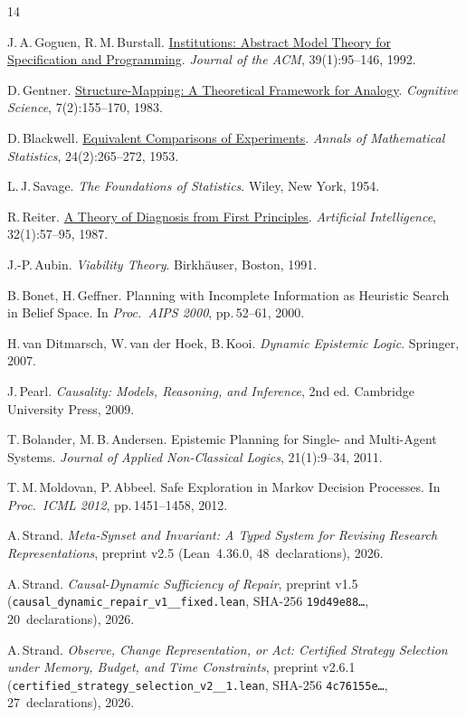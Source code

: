 \documentclass[10pt,a4paper]{article}
\theoremstyle{cleanthm}
\theoremstyle{cleandef}
\begin{document}
\begin{thebibliography}{14}
\small\setlength{\itemsep}{2pt}

J.\,A.\,Goguen, R.\,M.\,Burstall. \href{https://doi.org/10.1145/147508.147524}{Institutions: Abstract Model Theory for Specification and Programming}. \emph{Journal of the ACM}, 39(1):95--146, 1992.

D.\,Gentner. \href{https://doi.org/10.1207/s15516709cog0702_3}{Structure-Mapping: A Theoretical Framework for Analogy}. \emph{Cognitive Science}, 7(2):155--170, 1983.

D.\,Blackwell. \href{https://doi.org/10.1214/aoms/1177729032}{Equivalent Comparisons of Experiments}. \emph{Annals of Mathematical Statistics}, 24(2):265--272, 1953.

L.\,J.\,Savage. \emph{The Foundations of Statistics}. Wiley, New York, 1954.

R.\,Reiter. \href{https://doi.org/10.1016/0004-3702(87)90062-2}{A Theory of Diagnosis from First Principles}. \emph{Artificial Intelligence}, 32(1):57--95, 1987.

J.-P.\,Aubin. \emph{Viability Theory}. Birkh\"auser, Boston, 1991.

B.\,Bonet, H.\,Geffner. Planning with Incomplete Information as Heuristic Search in Belief Space. In \emph{Proc.\ AIPS 2000}, pp.\,52--61, 2000.

H.\,van Ditmarsch, W.\,van der Hoek, B.\,Kooi. \emph{Dynamic Epistemic Logic}. Springer, 2007.

J.\,Pearl. \emph{Causality: Models, Reasoning, and Inference}, 2nd ed. Cambridge University Press, 2009.

T.\,Bolander, M.\,B.\,Andersen. Epistemic Planning for Single- and Multi-Agent Systems. \emph{Journal of Applied Non-Classical Logics}, 21(1):9--34, 2011.

T.\,M.\,Moldovan, P.\,Abbeel. Safe Exploration in Markov Decision Processes. In \emph{Proc.\ ICML 2012}, pp.\,1451--1458, 2012.

A.\,Strand. \emph{Meta-Synset and Invariant: A Typed System for Revising Research Representations}, preprint v2.5 (Lean~4.36.0, 48~declarations), 2026.

A.\,Strand. \emph{Causal-Dynamic Sufficiency of Repair}, preprint v1.5 (\texttt{causal\_\allowbreak dynamic\_\allowbreak repair\_\allowbreak v1\_\_\allowbreak fixed.lean}, SHA-256 \texttt{19d49e88\ldots}, 20~declarations), 2026.

A.\,Strand. \emph{Observe, Change Representation, or Act: Certified Strategy Selection under Memory, Budget, and Time Constraints}, preprint v2.6.1 (\texttt{certified\_\allowbreak strategy\_\allowbreak selection\_\allowbreak v2\_\_\allowbreak 1.lean}, SHA-256 \texttt{4c76155e\ldots}, 27~declarations), 2026.

\end{thebibliography}
\end{document}

